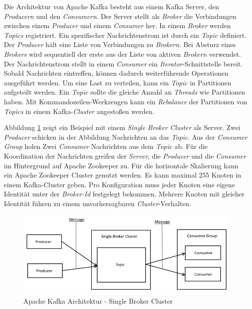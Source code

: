 Die Architektur von Apache Kafka besteht aus einem Kafka Server, den \textit{Producern} und den \textit{Consumern}. Der Server stellt als \textit{Broker} die Verbindungen zwischen einem \textit{Producer} und einem \textit{Consumer} her. In einem \textit{Broker} werden \textit{Topics} registriert. Ein spezifischer Nachrichtenstrom ist durch ein \textit{Topic} definiert. Der \textit{Producer} hält eine Liste von Verbindungen zu \textit{Brokern}. Bei Absturz eines \textit{Brokers} wird sequentiell der erste aus der Liste von aktiven \textit{Brokern} verwendet. Der Nachrichtenstrom stellt in einem \textit{Consumer} ein \textit{Iterator}-Schnittstelle bereit. Sobald Nachrichten eintreffen, können dadurch weiterführende Operationen ausgeführt werden. Um eine Last zu verteilen, kann ein \textit{Topic} in Partitionen aufgeteilt werden. Ein \textit{Topic} sollte die gleiche Anzahl an \textit{Threads} wie Partitionen haben. Mit Kommandozeilen-Werkzeugen kann ein \textit{Rebalance} der Partitionen von \textit{Topics} in einem Kafka-\textit{Cluster} angestoßen werden. 

Abbildung \ref{fig:kafkaDesign} zeigt ein Beispiel mit einem \textit{Single Broker Cluster} als Server. Zwei \textit{Producer} schicken in der Abbildung Nachrichten an das \textit{Topic}. Aus der \textit{Consumer Group} holen Zwei \textit{Consumer} Nachrichten aus dem \textit{Topic} ab. Für die Koordination der Nachrichten greifen der \textit{Server}, die \textit{Producer} und die \textit{Consumer} im Hintergrund auf Apache Zookeeper zu. Für die horizontale Skalierung kann ein Apache Zookeeper Cluster genutzt werden. Es kann maximal 255 Knoten in einem Kafka-Cluster geben. Pro Konfiguration muss jeder Knoten eine eigene Identität unter der \textit{Broker-Id} festgelegt bekommen. Mehrere Knoten mit gleicher Identität führen zu einem unvorhersagbaren \textit{Cluster}-Verhalten. 

\begin{figure}[htb!]
\centering
\includegraphics[width=1.0\textwidth]{bilder/kafkaDesign.png}
\caption{Apache Kafka Architektur - Single Broker Cluster
\label{fig:kafkaDesign}}
\end{figure}

